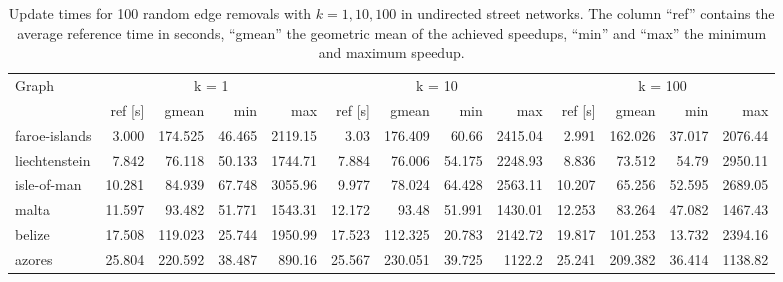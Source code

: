 \begin{landscape}

\begin{table}[h!]
\centering
\begin{tabular}{l|rrrr|rrrr|rrrr}
\toprule
Graph & \multicolumn{4}{c|}{k = 1} & \multicolumn{4}{c|}{k = 10} & \multicolumn{4}{c}{k = 100}\\
                &     ref [s] &   gmean &   min &     max &     ref [s] &   gmean &   min &     max &     ref [s] &   gmean &   min &     max \\
\midrule \midrule
 faroe-islands &  3.000     & 174.525 & 46.465 & 2119.15 &  3.03  & 176.409 & 60.66  & 2415.04 &  2.991 & 162.026 & 37.017 & 2076.44 \\
 liechtenstein &  7.842 &  76.118 & 50.133 & 1744.71 &  7.884 &  76.006 & 54.175 & 2248.93 &  8.836 &  73.512 & 54.79  & 2950.11 \\
 isle-of-man   & 10.281 &  84.939 & 67.748 & 3055.96 &  9.977 &  78.024 & 64.428 & 2563.11 & 10.207 &  65.256 & 52.595 & 2689.05 \\
 malta         & 11.597 &  93.482 & 51.771 & 1543.31 & 12.172 &  93.48  & 51.991 & 1430.01 & 12.253 &  83.264 & 47.082 & 1467.43 \\
 belize        & 17.508 & 119.023 & 25.744 & 1950.99 & 17.523 & 112.325 & 20.783 & 2142.72 & 19.817 & 101.253 & 13.732 & 2394.16 \\
 azores        & 25.804 & 220.592 & 38.487 &  890.16 & 25.567 & 230.051 & 39.725 & 1122.2  & 25.241 & 209.382 & 36.414 & 1138.82 \\
\bottomrule
\end{tabular}
\caption{Update times for 100 random edge removals with $k = 1, 10, 100$ in undirected street networks. The column ``ref'' contains the average reference time in seconds, ``gmean'' the geometric mean of the achieved speedups, ``min'' and ``max'' the minimum and maximum speedup.}
\end{table}


\end{landscape}
